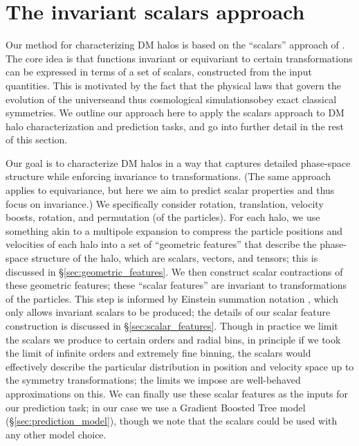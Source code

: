 \section{The invariant scalars approach}
\label{sec:scalars_approach}

Our method for characterizing DM halos is based on the ``scalars'' approach of \cite{Villar2021a}.
The core idea is that functions invariant or equivariant to certain transformations can be expressed in terms of a set of scalars, constructed from the input quantities.  
This is motivated by the fact that the physical laws that govern the evolution of the universe{\emdash}and thus cosmological simulations{\emdash}obey exact classical symmetries.
We outline our approach here to apply the scalars approach to DM halo characterization and prediction tasks, and go into further detail in the rest of this section.

Our goal is to characterize DM halos in a way that captures detailed phase-space structure while enforcing invariance to transformations.
(The same approach applies to equivariance, but here we aim to predict scalar properties and thus focus on invariance.)
We specifically consider rotation, translation, velocity boosts, rotation, and permutation (of the particles).
For each \dark halo, we use something akin to a multipole expansion to compress the particle positions and velocities of each halo into a set of ``geometric features'' that describe the phase-space structure of the halo, which are scalars, vectors, and tensors; this is discussed in \S\ref{sec:geometric_features}.
We then construct scalar contractions of these geometric features; these ``scalar features'' are invariant to transformations of the particles. 
This step is informed by Einstein summation notation \citep{einstein_grundlage_1916}, which only allows invariant scalars to be produced; the details of our scalar feature construction is discussed in \S\ref{sec:scalar_features}.
Though in practice we limit the scalars we produce to certain orders and radial bins, in principle if we took the limit of infinite orders and extremely fine binning, the scalars would effectively describe the particular distribution in position and velocity space up to the symmetry transformations; the limits we impose are well-behaved approximations on this.
We can finally use these scalar features as the inputs for our prediction task; in our case we use a Gradient Boosted Tree model (\S\ref{sec:prediction_model}), though we note that the scalars could be used with any other model choice.


